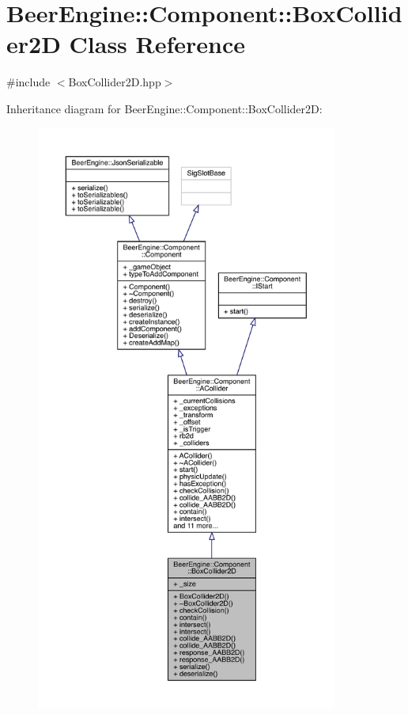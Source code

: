 \hypertarget{class_beer_engine_1_1_component_1_1_box_collider2_d}{}\section{Beer\+Engine\+:\+:Component\+:\+:Box\+Collider2D Class Reference}
\label{class_beer_engine_1_1_component_1_1_box_collider2_d}


{\ttfamily \#include $<$Box\+Collider2\+D.\+hpp$>$}



Inheritance diagram for Beer\+Engine\+:\+:Component\+:\+:Box\+Collider2D\+:\nopagebreak
\begin{figure}[H]
\begin{center}
\leavevmode
\includegraphics[height=550pt]{class_beer_engine_1_1_component_1_1_box_collider2_d__inherit__graph}
\end{center}
\end{figure}


